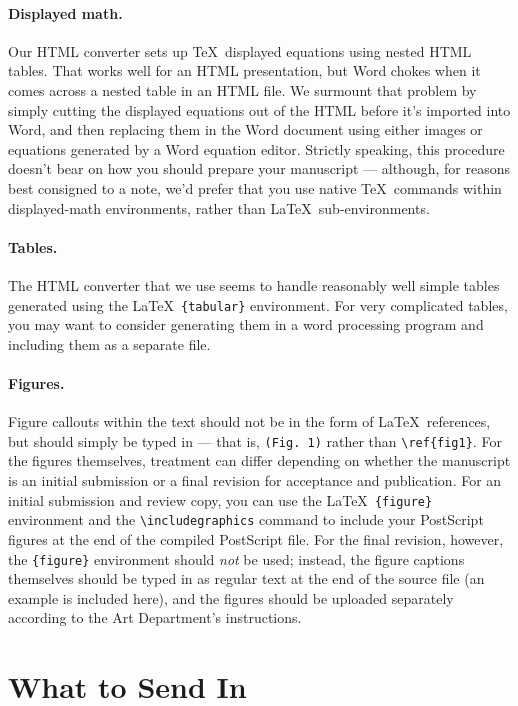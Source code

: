 \documentclass[12pt]{article}
\begin{document}
\paragraph*{Displayed math.} Our HTML converter sets up \TeX\
displayed equations using nested HTML tables.  That works well for an
HTML presentation, but Word chokes when it comes across a nested
table in an HTML file.  We surmount that problem by simply cutting the
displayed equations out of the HTML before it's imported into Word,
and then replacing them in the Word document using either images or
equations generated by a Word equation editor.  Strictly speaking,
this procedure doesn't bear on how you should prepare your manuscript
--- although, for reasons best consigned to a note, we'd
prefer that you use native \TeX\ commands within displayed-math
environments, rather than \LaTeX\ sub-environments.

\paragraph*{Tables.}  The HTML converter that we use seems to handle
reasonably well simple tables generated using the \LaTeX\
\texttt{\{tabular\}} environment.  For very complicated tables, you
may want to consider generating them in a word processing program and
including them as a separate file.

\paragraph*{Figures.}  Figure callouts within the text should not be
in the form of \LaTeX\ references, but should simply be typed in ---
that is, \verb+(Fig. 1)+ rather than \verb+\ref{fig1}+.  For the
figures themselves, treatment can differ depending on whether the
manuscript is an initial submission or a final revision for acceptance
and publication.  For an initial submission and review copy, you can
use the \LaTeX\ \verb+{figure}+ environment and the
\verb+\includegraphics+ command to include your PostScript figures at
the end of the compiled PostScript file.  For the final revision,
however, the \verb+{figure}+ environment should {\it not\/} be used;
instead, the figure captions themselves should be typed in as regular
text at the end of the source file (an example is included here), and
the figures should be uploaded separately according to the Art
Department's instructions.


\section*{What to Send In}
\end{document}
